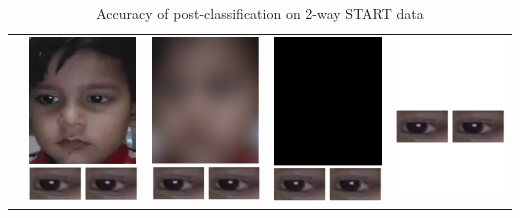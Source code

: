 \begin{table}[h]
  \centering
    \caption{Accuracy of post-classification on 2-way START data}
    \label{tab:2way_postClassif_START}
    \begin{tabular}{|c||c|c|c|c|}
      \hline
         & \includegraphics[scale=0.2,valign=m]{GazePreservingRedaction/No_redaction} & \includegraphics[scale=0.2,valign=m]{GazePreservingRedaction/Face_blurred} & \includegraphics[scale=0.2,valign=m]{GazePreservingRedaction/Face_blacked} & \includegraphics[scale=0.2,valign=m]{GazePreservingRedaction/No_face} \\

\end{tabular}
\end{table}

